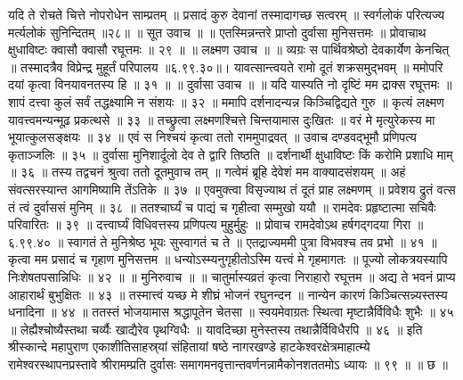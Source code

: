 यदि ते रोचते चित्ते नोपरोधेन साम्प्रतम् ॥
प्रसादं कुरु देवानां तस्मादागच्छ सत्वरम् ॥
स्वर्गलोकं परित्यज्य मर्त्यलोकं सुनिन्दितम् ॥२८॥
॥ सूत उवाच ॥ ॥
एतस्मिन्नन्तरे प्राप्तो दुर्वासा मुनिसत्तमः ॥
प्रोवाचाथ क्षुधाविष्टः क्वासौ क्वासौ रघूत्तमः ॥ २९ ॥
॥ लक्ष्मण उवाच ॥ ॥
व्यग्रः स पार्थिवश्रेष्ठो देवकार्येण केनचित् ॥
तस्मादत्रैव विप्रेन्द्र मुहूर्तं परिपालय ॥६.९९.३०॥।
यावत्सान्त्वयते रामो दूतं शक्रसमुद्भवम् ॥
ममोपरि दयां कृत्वा विनयावनतस्य हि ॥ ३१ ॥
॥ दुर्वासा उवाच ॥ ॥
यदि यास्यति नो दृष्टिं मम द्राक्स रघूत्तमः ॥
शापं दत्त्वा कुलं सर्वं तद्धक्ष्यामि न संशयः ॥ ३२ ॥
ममापि दर्शनादन्यन्न किञ्चिद्विद्यते गुरु ॥
कृत्यं लक्ष्मण यावत्त्वमन्यन्मूढ़ प्रकत्थसे ॥ ३३ ॥
तच्छ्रुत्वा लक्ष्मणश्चित्ते चिन्तयामास दुःखितः ॥
वरं मे मृत्युरेकस्य मा भूयात्कुलसङ्क्षयः ॥ ३४ ॥
एवं स निश्चयं कृत्वा ततो राममुपाद्रवत् ॥
उवाच दण्डवद्भूमौ प्रणिपत्य कृताञ्जलिः ॥ ३५ ॥
दुर्वासा मुनिशार्दूलो देव ते द्वारि तिष्ठति ॥
दर्शनार्थी क्षुधाविष्टः किं करोमि प्रशाधि माम् ॥ ३६ ॥
तस्य तद्वचनं श्रुत्वा ततो दूतमुवाच तम् ॥
गत्वेमं ब्रूहि देवेशं मम वाक्यादसंशयम् ॥
अहं संवत्सरस्यान्त आगमिष्यामि तेंऽतिके ॥ ३७ ॥
एवमुक्त्वा विसृज्याथ तं दूतं प्राह लक्ष्मणम् ॥
प्रवेशय द्रुतं वत्स तं त्वं दुर्वाससं मुनिम् ॥ ३८ ॥
ततश्चार्घ्यं च पाद्यं च गृहीत्वा सम्मुखो ययौ ॥
रामदेवः प्रहृष्टात्मा सचिवैः परिवारितः ॥ ३९ ॥
दत्त्वार्घ्यं विधिवत्तस्य प्रणिपत्य मुहुर्मुहुः ॥
प्रोवाच रामदेवोऽथ हर्षगद्गदया गिरा ॥ ६.९९.४० ॥
स्वागतं ते मुनिश्रेष्ठ भूयः सुस्वागतं च ते ॥
एतद्राज्यममी पुत्रा विभवश्च तव प्रभो ॥ ४१ ॥
कृत्वा मम प्रसादं च गृहाण मुनिसत्तम ॥
धन्योऽस्म्यनुगृहीतोऽस्मि यत्त्वं मे गृहमागतः ॥
पूज्यो लोकत्रयस्यापि निःशेषतपसान्निधिः ॥ ४२ ॥
॥ मुनिरुवाच ॥ ॥
चातुर्मास्यव्रतं कृत्वा निराहारो रघूत्तम ॥
अद्य ते भवनं प्राप्य आहारार्थं बुभुक्षितः ॥ ४३ ॥
तस्मात्त्वं यच्छ मे शीघ्रं भोजनं रघुनन्दन ॥
नान्येन कारणं किञ्चित्सन्न्यस्तस्य धनादिना ॥ ४४ ॥
ततस्तं भोजयामास श्रद्धापूतेन चेतसा ॥
स्वयमेवाग्रतः स्थित्वा मृष्टान्नैर्विविधैः शुभैः ॥ ४५ ॥
लेह्यैश्चोष्यैस्तथा चर्व्यैः खाद्यैरेव पृथग्विधैः ॥
यावदिच्छा मुनेस्तस्य तथान्नैर्विविधैरपि ॥ ४६ ॥
इति श्रीस्कान्दे महापुराण एकाशीतिसाहस्र्यां संहितायां षष्ठे नागरखण्डे हाटकेश्वरक्षेत्रमाहात्म्ये रामेश्वरस्थापनप्रस्तावे श्रीरामम्प्रति दुर्वासः समागमनवृत्तान्तवर्णनन्नामैकोनशततमोऽ ध्यायः ॥ ९९ ॥ ॥ छ ॥


